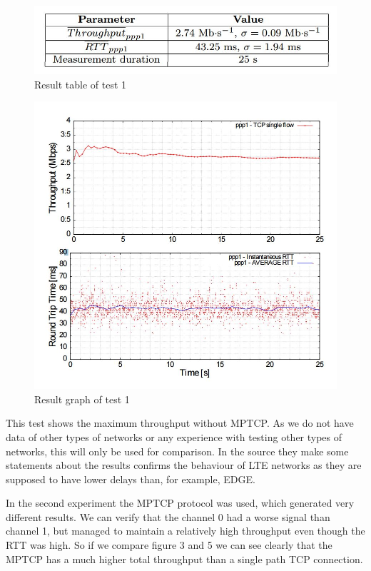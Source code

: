 \documentclass[11pt,twocolumn]{article}
\begin{document}
\begin{figure}[ht]
\begin{center}
\includegraphics[scale=0.5]{table_1}
\caption{Result table of test 1}
\end{center}
\end{figure}
\begin{figure}[ht]
\begin{center}
\includegraphics[scale=0.5]{graph_1}
\caption{Result graph of test 1}
\end{center}
\end{figure}

This test shows the maximum throughput without MPTCP. As we do not have data of other types of networks or any experience with testing other types of networks, this will only be used for comparison. In the source they make some statements about the results confirms the behaviour of LTE networks as they are supposed to have lower delays than, for example, EDGE.

In the second experiment the MPTCP protocol was used, which generated very different results. We can verify that the channel 0 had a worse signal than channel 1, but managed to maintain a relatively high throughput even though the RTT was high. So if we compare figure 3 and 5 we can see clearly that the MPTCP has a much higher total throughput than a single path TCP connection.
\end{document}
